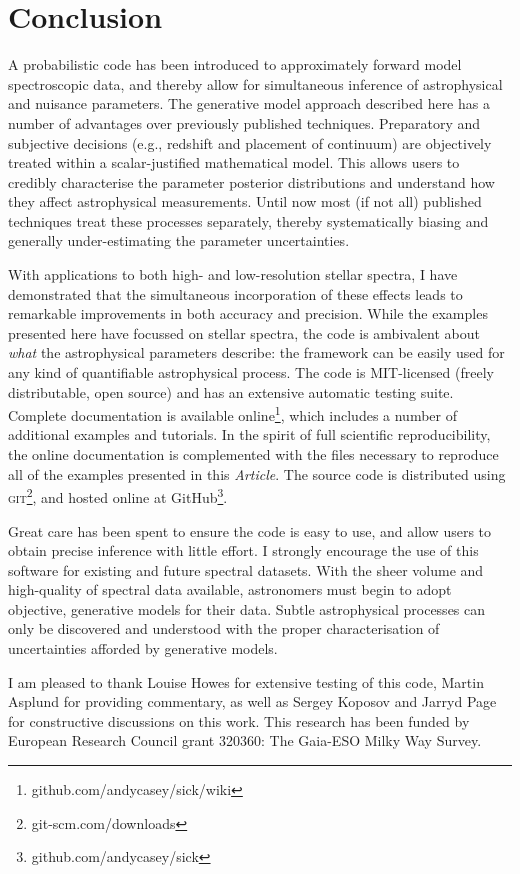 \documentclass{aastex}
\newcommand{\article}{\textit{Article}}
\begin{document}
\section{Conclusion}
\label{sec:conclusions}

A probabilistic code has been introduced to approximately forward model 
spectroscopic data, and thereby allow for simultaneous inference of astrophysical 
and nuisance parameters. The generative model approach described here has a number 
of advantages over previously published techniques. Preparatory and subjective 
decisions (e.g., redshift and placement of continuum) are objectively treated 
within a scalar-justified mathematical model. This allows users to credibly 
characterise the parameter posterior distributions and understand how they affect 
astrophysical measurements. Until now most (if not all) published techniques treat 
these processes separately, thereby systematically biasing and generally 
under-estimating the parameter uncertainties.

With applications to both high- and low-resolution stellar spectra, I have 
demonstrated that the simultaneous incorporation of these effects leads to 
remarkable improvements in both accuracy and precision. While the examples 
presented here have focussed on stellar spectra, the code is ambivalent about 
\textit{what} the astrophysical parameters describe: the framework can be easily 
used for any kind of quantifiable astrophysical process. The code is MIT-licensed 
(freely distributable, open source) and has an extensive automatic testing suite. 
Complete documentation is available online\footnote{github.com/andycasey/sick/wiki}, 
which includes a number of additional examples and tutorials. In the spirit of 
full scientific reproducibility, the online documentation is complemented with the 
files necessary to reproduce all of the examples presented in this \article{}. 
The source code is distributed using \textsc{git}\footnote{git-scm.com/downloads}, 
and hosted online at GitHub\footnote{github.com/andycasey/sick}. 

Great care has been spent to ensure the code is easy to use, and allow users to 
obtain precise inference with little effort. I strongly encourage the use of this 
software for existing and future spectral datasets. With the sheer volume and 
high-quality of spectral data available, astronomers must begin to adopt objective, 
generative models for their data. Subtle astrophysical processes can only be 
discovered and understood with the proper characterisation of uncertainties 
afforded by generative models.

\acknowledgements
I am pleased to thank Louise Howes for extensive testing of this code, Martin 
Asplund for providing commentary, as well as Sergey Koposov and Jarryd Page for 
constructive discussions on this work. This research has been funded by European 
Research Council grant 320360: The Gaia-ESO Milky Way Survey. 




\end{document}
